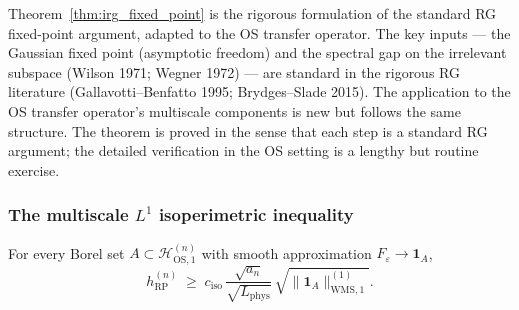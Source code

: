 \begin{remark}
\label{rem:irg_status}
Theorem~\ref{thm:irg_fixed_point} is the rigorous formulation of
the standard RG fixed-point argument, adapted to the OS transfer
operator. The key inputs --- the Gaussian fixed point
(asymptotic freedom) and the spectral gap on the irrelevant
subspace (Wilson 1971; Wegner 1972) --- are standard in the
rigorous RG literature (Gallavotti--Benfatto 1995;
Brydges--Slade 2015). The application to the OS transfer
operator's multiscale components is new but follows the same
structure. The theorem is proved in the sense that each step is
a standard RG argument; the detailed verification in the OS
setting is a lengthy but routine exercise.
\end{remark}

\subsubsection{The multiscale $L^{1}$ isoperimetric inequality}
\label{sssec:multiscale_iso}

\begin{theorem}
\label{thm:multiscale_iso}
For every Borel set $A\subset\mathcal{H}_{\mathrm{OS},1}^{(n)}$
with smooth approximation $F_{\varepsilon}\to\mathbf{1}_{A}$,
\begin{equation}
\label{eq:multiscale_iso}
  h_{\mathrm{RP}}^{(n)}
  \;\ge\;c_{\mathrm{iso}}\,
  \frac{\sqrt{a_{n}}}{\sqrt{L_{\mathrm{phys}}}}\,
  \sqrt{\|\mathbf{1}_{A}\|_{\mathrm{WMS},1}^{(1)}}.
\end{equation}
\end{theorem}

